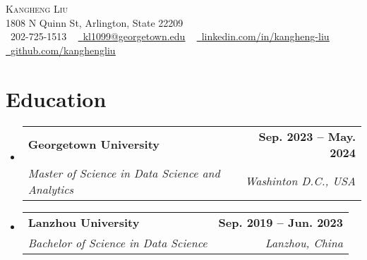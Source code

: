 \documentclass[letterpaper,11pt]{article}
\makeatletter
\newcommand{\resumeSubheading}[4]{
  \vspace{-2pt}\item
    \begin{tabular*}{1.0\textwidth}[t]{l@{\extracolsep{\fill}}r}
      \textbf{#1} & \textbf{\small #2} \\
      \textit{\small#3} & \textit{\small #4} \\
    \end{tabular*}\vspace{-7pt}
}
\newcommand{\resumeSubHeadingListStart}{\begin{itemize}[leftmargin=0.0in, label={}]}
\newcommand{\resumeSubHeadingListEnd}{\end{itemize}}
\makeatother
\begin{document}

\begin{center}
    {\Huge \scshape Kangheng Liu} \\ \vspace{1pt}
    1808 N Quinn St, Arlington, State 22209 \\ \vspace{1pt}
    \small \raisebox{-0.1\height}\faPhone\ 202-725-1513 ~ \href{mailto:kl1099@georgetown.edu}{\raisebox{-0.2\height}\faEnvelope\  \underline{kl1099@georgetown.edu}} ~ 
    \href{https://www.linkedin.com/in/kangheng-liu-7a5754295/}{\raisebox{-0.2\height}\faLinkedin\ \underline{linkedin.com/in/kangheng-liu}}  ~
    \href{https://github.com/kanghengliu}{\raisebox{-0.2\height}\faGithub\ \underline{github.com/kanghengliu}}
    \vspace{-8pt}
\end{center}


\section{Education}
  \resumeSubHeadingListStart
    \resumeSubheading
      {Georgetown University}{Sep. 2023 -- May. 2024}
      {Master of Science in Data Science and Analytics}{Washinton D.C., USA}
    \resumeSubheading
      {Lanzhou University}{Sep. 2019 -- Jun. 2023}
      {Bachelor of Science in Data Science}{Lanzhou, China}
  \resumeSubHeadingListEnd
\end{document}
